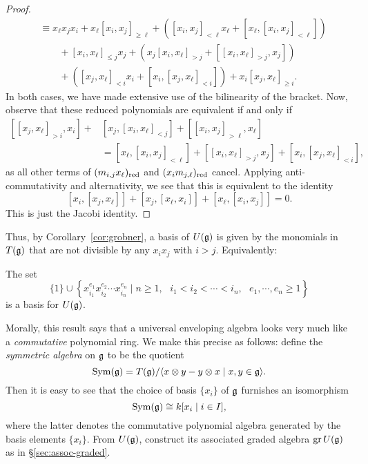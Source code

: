 \begin{proof}
\begin{align*}
&\equiv x_\ell x_jx_i+x_\ell[x_i,x_j]_{\ge \ell}+([x_i,x_j]_{<\ell}x_\ell+[x_\ell,[x_i,x_j]_{<\ell}])\\
&\qquad+[x_i,x_\ell]_{\le j}x_j+(x_j[x_i,x_\ell]_{>j}+[[x_i,x_\ell]_{>j},x_j])\\
&\qquad+([x_j,x_\ell]_{<i}x_i+[x_i,[x_j,x_\ell]_{<i}])+x_i[x_j,x_\ell]_{\ge i}.
\end{align*}
In both cases, we have made extensive use of the bilinearity of the bracket. Now, observe that these reduced polynomials are equivalent if and only if
\begin{equation}
\label{eqn:ueaconsistency}
\begin{split}
[[x_j,x_\ell]_{>i},x_i]+&[x_j,[x_i,x_\ell]_{<j}]+[[x_i,x_j]_{>\ell},x_\ell]\\
&=[x_\ell,[x_i,x_j]_{<\ell}]+[[x_i,x_\ell]_{>j},x_j]+[x_i,[x_j,x_\ell]_{<i}],
\end{split}
\end{equation}
as all other terms of $(m_{i,j}x_\ell)_{\mathrm{red}}$ and $(x_im_{j,\ell})_{\mathrm{red}}$ cancel. Applying anti-commutativity and alternativity, we see that this is equivalent to the identity
\begin{equation}
\label{eqn:jacobi}
[x_i,[x_j,x_\ell]]+[x_j,[x_\ell,x_i]]+[x_\ell,[x_i,x_j]]=0.
\end{equation}
This is just the Jacobi identity.
\end{proof}

Thus, by Corollary~\ref{cor:grobner}, a basis of $U(\mathfrak{g})$ is given by the monomials in $T(\mathfrak{g})$ that are not divisible by any $x_ix_j$ with $i>j$. Equivalently:
\begin{thm}
\label{thm:ugbasis}
The set
\begin{equation}
\label{eqn:ugbasis}
\{1\}\cup\left\{x_{i_1}^{e_1}x_{i_2}^{e_2}\cdots x_{i_n}^{e_n}\mid n\ge 1,\text{ }i_1<i_2<\cdots<i_n,\text{ }e_1,\cdots,e_n\ge 1\right\}
\end{equation}
is a basis for $U(\mathfrak{g})$.
\end{thm}
Morally, this result says that a universal enveloping algebra looks very much like a \emph{commutative} polynomial ring. We make this precise as follows: define the \emph{symmetric algebra} on $\mathfrak{g}$ to be the quotient
\begin{equation*}
\operatorname{Sym}(\mathfrak{g})=T(\mathfrak{g})/\langle x\otimes y-y\otimes x\mid x,y\in\mathfrak{g}\rangle.
\end{equation*}
Then it is easy to see that the choice of basis $\{x_i\}$ of $\mathfrak{g}$ furnishes an isomorphism
\begin{equation}
\label{eqn:symisopoly}
\operatorname{Sym}(\mathfrak{g})\cong k[x_i\mid i\in I],
\end{equation}
where the latter denotes the commutative polynomial algebra generated by the basis elements $\{x_i\}$. From $U(\mathfrak{g})$, construct its associated graded algebra $\operatorname{gr} U(\mathfrak{g})$ as in \S\ref{sec:assoc-graded}.

